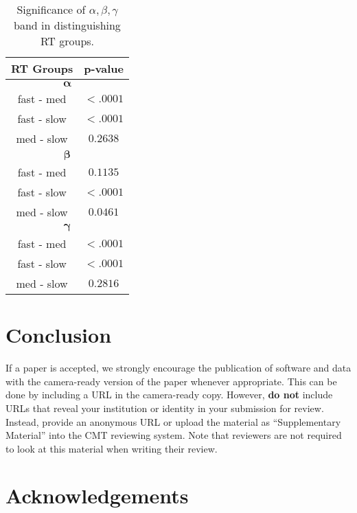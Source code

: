 \documentclass{article}
\begin{document}
\begin{table}[h!tb]
    \centering
    \caption{Significance of $\alpha, \beta, \gamma$ band in distinguishing RT groups.}
    \begin{tabular}{c | c}
      \hline
      \textbf{RT Groups} & \textbf{p-value} \\
      \hline
      \multicolumn{2}{c}{$\mathbf{\alpha}$} \\
      \hline
      fast - med & $<.0001$ \\
      fast - slow & $<.0001$  \\
      med - slow & $0.2638$ \\
      \hline
      \multicolumn{2}{c}{$\mathbf{\beta}$} \\
      \hline
      fast - med & $0.1135$ \\
      fast - slow & $<.0001$  \\
      med - slow & $0.0461$ \\
      \hline
      \multicolumn{2}{c}{$\mathbf{\gamma}$} \\
      \hline
      fast - med & $<.0001$ \\
      fast - slow & $<.0001$  \\
      med - slow & $0.2816$ \\
      \hline
    \end{tabular}

    \label{tab:spec_comp}
\end{table}

\section{Conclusion}

If a paper is accepted, we strongly encourage the publication of software and data with the
camera-ready version of the paper whenever appropriate. This can be
done by including a URL in the camera-ready copy. However, \textbf{do not}
include URLs that reveal your institution or identity in your
submission for review. Instead, provide an anonymous URL or upload
the material as ``Supplementary Material'' into the CMT reviewing
system. Note that reviewers are not required to look at this material
when writing their review.

\section*{Acknowledgements}
\end{document}
